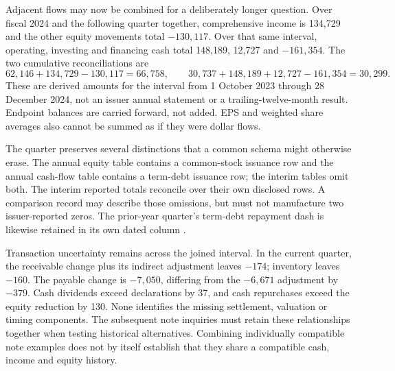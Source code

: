 Adjacent flows may now be combined for a deliberately longer question.
Over fiscal 2024 and the following quarter together, comprehensive income is
134,729 and the other equity movements total $-130{,}117$. Over that same
interval, operating, investing and financing cash total 148,189, 12,727 and
$-161{,}354$. The two cumulative reconciliations are
\[
62{,}146+134{,}729-130{,}117=66{,}758,
\qquad
30{,}737+148{,}189+12{,}727-161{,}354=30{,}299.
\]
These are derived amounts for the interval from 1 October 2023 through
28 December 2024, not an issuer annual statement or a trailing-twelve-month
result. Endpoint balances are carried forward, not added. EPS and weighted
share averages also cannot be summed as if they were dollar flows.

The quarter preserves several distinctions that a common schema might
otherwise erase. The annual equity table contains a common-stock issuance
row and the annual cash-flow table contains a term-debt issuance row; the
interim tables omit both. The interim reported totals reconcile over their
own disclosed rows. A comparison record may describe those omissions, but
must not manufacture two issuer-reported zeros. The prior-year quarter's
term-debt repayment dash is likewise retained in its own dated column
\citep[printed pp.~4--5]{apple2025q1}.

Transaction uncertainty remains across the joined interval. In the current
quarter, the receivable change plus its indirect adjustment leaves $-174$;
inventory leaves $-160$. The payable change is $-7{,}050$, differing from
the $-6{,}671$ adjustment by $-379$. Cash dividends exceed declarations by
37, and cash repurchases exceed the equity reduction by 130. None identifies
the missing settlement, valuation or timing components. The subsequent note
inquiries must retain these relationships together when testing historical
alternatives. Combining individually compatible note examples does not by
itself establish that they share a compatible cash, income and equity history.

